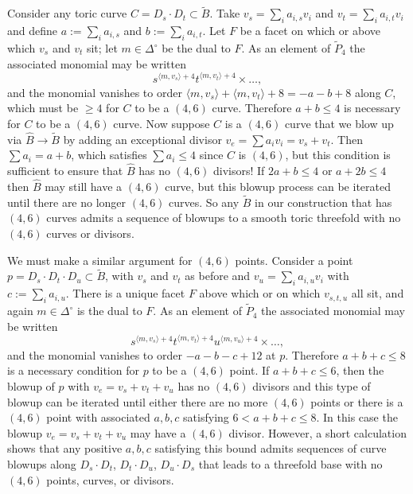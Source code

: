 \documentclass[aps,prl,twocolumn, superscriptaddress,groupedaddress,nofootinbib]{revtex4}
\newcommand{\vev}[1]{\langle #1 \rangle}
\begin{document}
Consider any toric curve $C=D_s\cdot D_t \subset \tilde B$. Take $v_s=\sum_i a_{i,s} v_i$ and $v_t=\sum_i a_{i,t} v_i$ and define $a:=\sum_i a_{i,s}$ and $b:=\sum_i a_{i,t}$. Let $F$ be a facet
on which or above which $v_s$ and $v_t$ sit; let $m\in \Delta^\circ$ be the dual to $F$. As an
element of $\tilde P_4$ the associated monomial may be written
\begin{equation}
s^{\vev{m,v_s}+4}t^{\vev{m,v_t}+4}\times \dots,
\end{equation}
and the monomial vanishes to order $\vev{m,v_s}+\vev{m,v_t}+8=-a-b+8$ along $C$,
which must be $\geq 4$ for $C$ to be a $(4,6)$ curve. Therefore $a+b\leq 4$ is necessary for
$C$ to be a $(4,6)$ curve.
Now suppose $C$ is a $(4,6)$ curve that we blow up via $\hat B\to \tilde B$ by
adding an exceptional divisor $v_e = \sum a_i v_i = v_s + v_t$. Then $\sum a_i=a+b$,
which satisfies $\sum a_i\leq 4$ since $C$ is $(4,6)$, but this condition is sufficient to ensure that $\hat B$ has no $(4,6)$ divisors! If $2a+b\leq 4$
or $a+2b\leq 4$ then $\hat B$ may still have a $(4,6)$ curve, but
this blowup process can be iterated until there are no longer
$(4,6)$ curves. So any $\tilde B$ in our construction that has
$(4,6)$ curves admits a sequence of blowups to a smooth toric
threefold with no $(4,6)$ curves or divisors.

We must make a similar argument for $(4,6)$ points. Consider
a point $p=D_s\cdot D_t \cdot D_u \subset \tilde B$, with $v_s$
and $v_t$ as before and $v_u=\sum_i a_{i,u} v_i$ with 
$c:=\sum_i a_{i,u}$. There is a unique facet $F$ above which
or on which $v_{s,t,u}$ all sit, and again $m\in \Delta^\circ$
is the dual to $F$. As an
element of $\tilde P_4$ the associated monomial may be written
\begin{equation}
s^{\vev{m,v_s}+4}t^{\vev{m,v_t}+4}u^{\vev{m,v_u}+4}\times \dots,
\end{equation}
and the monomial vanishes to order $-a-b-c+12$ at $p$.
Therefore $a+b+c\leq 8$ is a necessary condition for $p$ to
be a $(4,6)$ point. If $a+b+c\leq 6$, then the 
blowup of $p$ with $v_e = v_s + v_t + v_u$ has no $(4,6)$
divisors and this type of blowup can be iterated until
either there are no more $(4,6)$ points or there is a $(4,6)$ point
with associated $a, b, c$ satisfying $6<a+b+c\leq 8$.  In
this case the blowup $v_e=v_s+v_t+v_u$ may have a $(4,6)$
divisor. However, a short calculation shows that any positive $a,b,c$
satisfying this bound admits sequences of curve blowups along
$D_s\cdot D_t$, $D_t\cdot D_u$, $D_u\cdot D_s$ that leads to
a threefold base with no $(4,6)$ points, curves, or divisors.
\end{document}
